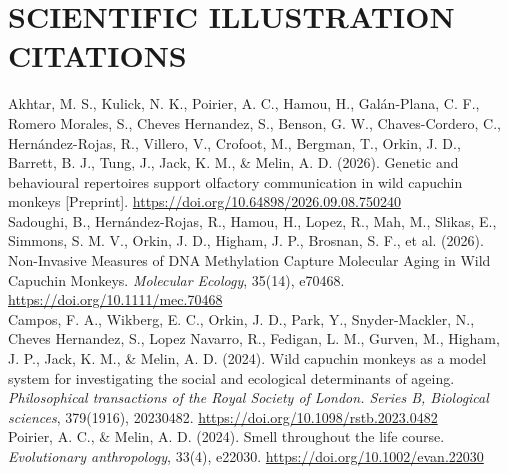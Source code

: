 \documentclass[a4paper,9pt]{extarticle}
\begin{document}
\vspace{1em}

\section*{SCIENTIFIC ILLUSTRATION CITATIONS}
    \noindent
    Akhtar, M. S., Kulick, N. K., Poirier, A. C., Hamou, H., Galán-Plana, C. F., Romero Morales, S., Cheves Hernandez, S., Benson, G. W., Chaves-Cordero, C., Hernández-Rojas, R., Villero, V., Crofoot, M., Bergman, T., Orkin, J. D., Barrett, B. J., Tung, J., Jack, K. M., \& Melin, A. D. (2026). Genetic and behavioural repertoires support olfactory communication in wild capuchin monkeys [Preprint]. \url{https://doi.org/10.64898/2026.09.08.750240}\\[6pt]
    \noindent
    Sadoughi, B., Hernández-Rojas, R., Hamou, H., Lopez, R., Mah, M., Slikas, E., Simmons, S. M. V., Orkin, J. D., Higham, J. P., Brosnan, S. F., et al. (2026). Non-Invasive Measures of DNA Methylation Capture Molecular Aging in Wild Capuchin Monkeys. \textit{Molecular Ecology}, 35(14), e70468. \url{https://doi.org/10.1111/mec.70468}\\[6pt]
    \noindent
    Campos, F. A., Wikberg, E. C., Orkin, J. D., Park, Y., Snyder-Mackler, N., Cheves Hernandez, S., Lopez Navarro, R., Fedigan, L. M., Gurven, M., Higham, J. P., Jack, K. M., \& Melin, A. D. (2024). Wild capuchin monkeys as a model system for investigating the social and ecological determinants of ageing. \textit{Philosophical transactions of the Royal Society of London. Series B, Biological sciences}, 379(1916), 20230482. \url{https://doi.org/10.1098/rstb.2023.0482}\\[6pt]
    \noindent
    Poirier, A. C., \& Melin, A. D. (2024). Smell throughout the life course. \textit{Evolutionary anthropology}, 33(4), e22030. \url{https://doi.org/10.1002/evan.22030}

\end{document}
